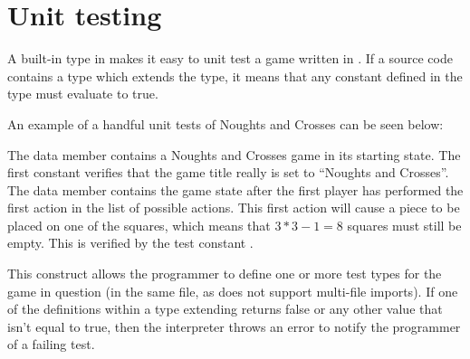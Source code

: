 \section{Unit testing}
\label{sec:unittesting}
A built-in type in \productname{} makes it easy to unit test a game
written in \productname{}. If a source code contains a type which
extends the  type, it means that any constant defined
in the type must evaluate to true.

An example of a handful unit tests of Noughts and Crosses can be seen
below:


The data member  contains a Noughts and Crosses game in
its starting state. The first constant  verifies
that the game title really is set to ``Noughts and Crosses''. The data
member  contains the game state after the first player
has performed the first action in the list of possible actions. This
first action will cause a piece to be placed on one of the squares,
which means that $3*3 - 1 = 8$ squares must still be empty. This is
verified by the test constant .

This construct allows the programmer to define one or more test types
for the game in question (in the same file, as \productname{} does not
support multi-file imports). If one of the definitions within a type
extending  returns false or any other value that isn't
equal to true, then the interpreter throws an
error to notify the programmer of a failing test.
